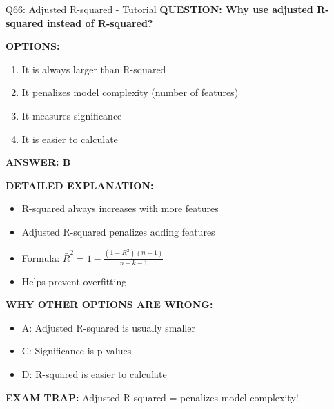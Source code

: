 \documentclass[8pt]{beamer}
\begin{document}
	\begin{frame}{Q66: Adjusted R-squared - Tutorial}
		\fontsize{6.5}{7.5}\selectfont
		\textbf{QUESTION: Why use adjusted R-squared instead of R-squared?}
		
		\vspace{0.1cm}
		\textbf{OPTIONS:}
		\begin{enumerate}
			\item It is always larger than R-squared
			\item It penalizes model complexity (number of features)
			\item It measures significance
			\item It is easier to calculate
		\end{enumerate}
		
		\vspace{0.1cm}
		\textcolor{myblue}{\textbf{ANSWER: B}}
		
		\vspace{0.1cm}
		\textbf{DETAILED EXPLANATION:}
		\begin{itemize}
			\item R-squared always increases with more features
			\item Adjusted R-squared penalizes adding features
			\item Formula: $\bar{R}^2 = 1 - \frac{(1-R^2)(n-1)}{n-k-1}$
			\item Helps prevent overfitting
		\end{itemize}
		
		\vspace{0.1cm}
		\textcolor{myred}{\textbf{WHY OTHER OPTIONS ARE WRONG:}}
		\begin{itemize}
			\item \textcolor{myred}{A:} Adjusted R-squared is usually smaller
			\item \textcolor{myred}{C:} Significance is p-values
			\item \textcolor{myred}{D:} R-squared is easier to calculate
		\end{itemize}
		
		\textcolor{myred}{\textbf{EXAM TRAP:}} Adjusted R-squared = \textcolor{myblue}{penalizes model complexity}!
	\end{frame}
	
\end{document}
